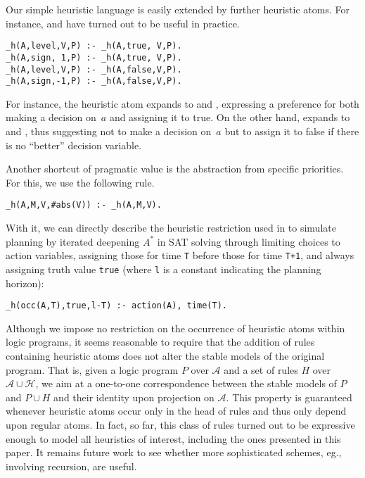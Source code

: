 Our simple heuristic language is easily extended by further heuristic atoms.
For instance,  and  have turned out to be useful in practice.
\begin{lstlisting}
_h(A,level,V,P) :- _h(A,true, V,P).
_h(A,sign, 1,P) :- _h(A,true, V,P).
_h(A,level,V,P) :- _h(A,false,V,P).
_h(A,sign,-1,P) :- _h(A,false,V,P).
\end{lstlisting}
%
For instance, the heuristic atom  expands to 
 and ,
expressing a preference for both making a decision on~$a$ and
assigning it to true.
On the other hand,
 expands to 
 and ,
thus suggesting not to make a decision on~$a$ but to
assign it to false if there is no ``better'' decision variable.

Another shortcut of pragmatic value is the abstraction from specific priorities.
For this, we use the following rule.
\begin{lstlisting}
_h(A,M,V,#abs(V)) :- _h(A,M,V).
\end{lstlisting}
With it,
we can directly describe the heuristic restriction used in \cite{rintanen11a} to simulate planning
by iterated deepening $A^*$ \cite{korf85a} in SAT solving through limiting choices to action variables,
assigning those for time \texttt{T} before those for time \texttt{T+1}, and always assigning truth
value \texttt{true} (where \texttt{l} is a constant indicating the planning horizon):
\begin{lstlisting}
_h(occ(A,T),true,l-T) :- action(A), time(T).
\end{lstlisting}

Although we impose no restriction on the occurrence of heuristic atoms within logic programs,
it seems reasonable to require that the addition of rules containing heuristic atoms does not alter
the stable models of the original program.
That is, given a logic program $P$ over $\mathcal{A}$ and a set of rules $H$ over $\mathcal{A}\cup\mathcal{H}$,
we aim at a one-to-one correspondence between the stable models of $P$ and $P\cup H$ and
their identity upon projection on $\mathcal{A}$.
This property is guaranteed whenever heuristic atoms occur only in the head of rules and thus only
depend upon regular atoms.
In fact, so far, this class of rules turned out to be expressive enough to model all heuristics of interest,
including the ones presented in this paper.
It remains future work to see whether more sophisticated schemes, eg., involving recursion, are useful.


